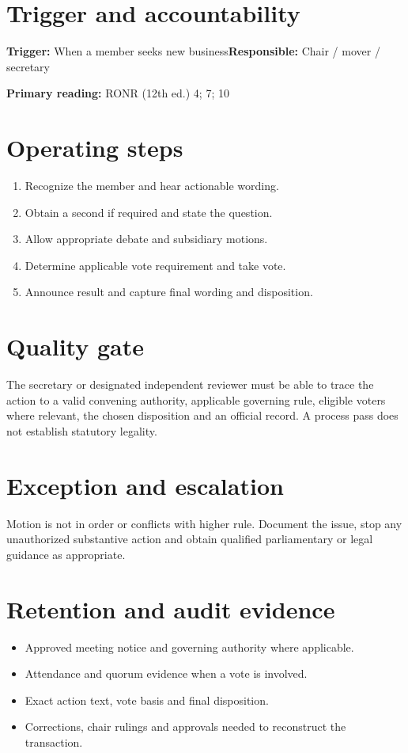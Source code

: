 \documentclass[11pt]{article}
\begin{document}
\SuiteOpen
{}
\section{Trigger and accountability}
\textbf{Trigger:} When a member seeks new business\quad\textbf{Responsible:} Chair / mover / secretary

\textbf{Primary reading:} RONR (12th ed.) 4; 7; 10

\section{Operating steps}
\begin{enumerate}[leftmargin=*,itemsep=4pt]
\item Recognize the member and hear actionable wording.
\item Obtain a second if required and state the question.
\item Allow appropriate debate and subsidiary motions.
\item Determine applicable vote requirement and take vote.
\item Announce result and capture final wording and disposition.
\end{enumerate}

\section{Quality gate}
The secretary or designated independent reviewer must be able to trace the action to a valid convening authority, applicable governing rule, eligible voters where relevant, the chosen disposition and an official record. A process pass does not establish statutory legality.

\section{Exception and escalation}
Motion is not in order or conflicts with higher rule. Document the issue, stop any unauthorized substantive action and obtain qualified parliamentary or legal guidance as appropriate.

\section{Retention and audit evidence}
\begin{itemize}[leftmargin=*,itemsep=4pt]
\item Approved meeting notice and governing authority where applicable.
\item Attendance and quorum evidence when a vote is involved.
\item Exact action text, vote basis and final disposition.
\item Corrections, chair rulings and approvals needed to reconstruct the transaction.
\end{itemize}
\end{document}

